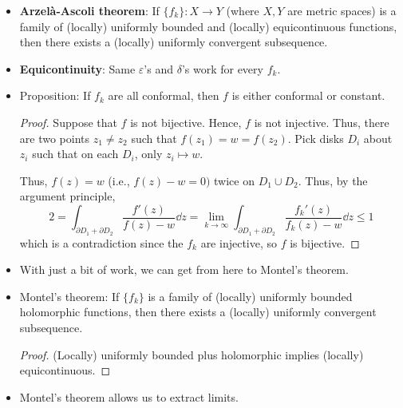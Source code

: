 \documentclass[../notes.tex]{subfiles}
\begin{document}
\begin{itemize}
\begin{enumerate}
        \item Take a limit of this maximizing sequence (this is where the real magic happens, using the argument principle and such).
        \begin{proof}[Proof Sketch]
            Set $\mathcal{F}=\{f:U\to\D\mid\text{conformal, }f(z_0)=0\}$. This family is uniformly bounded (e.g., by the unit disk). Let
            \begin{equation*}
                \alpha := \sup_{f\in\mathcal{F}}|f'(z_0)|
            \end{equation*}
            The set of all $f_k$ such that $|f_k'(z_0)|\to\alpha$ has a uniformly convergent subsequence. If $f_k\to f$ locally uniformly, then by the theorem from last class, $f$ is holomorphic. Additionally, $f$ is also conformal because it is holomorphic and bijective (see the following proposition), hence biholomorphic.
        \end{proof}
    \end{enumerate}
    \item \textbf{Arzel\`{a}-Ascoli theorem}: If $\{f_k\}:X\to Y$ (where $X,Y$ are metric spaces) is a family of (locally) uniformly bounded and (locally) equicontinuous functions, then there exists a (locally) uniformly convergent subsequence.
    \item \textbf{Equicontinuity}: Same $\varepsilon$'s and $\delta$'s work for every $f_k$.
    \item Proposition: If $f_k$ are all conformal, then $f$ is either conformal or constant.
    \begin{proof}
        Suppose that $f$ is not bijective. Hence, $f$ is not injective. Thus, there are two points $z_1\neq z_2$ such that $f(z_1)=w=f(z_2)$. Pick disks $D_i$ about $z_i$ such that on each $D_i$, only $z_i\mapsto w$.\par
        Thus, $f(z)=w$ (i.e., $f(z)-w=0)$ twice on $D_1\cup D_2$. Thus, by the argument principle,
        \begin{equation*}
            2 = \int_{\partial D_1+\partial D_2}\frac{f'(z)}{f(z)-w}\dd{z}
            = \lim_{k\to\infty}\int_{\partial D_1+\partial D_2}\frac{f_k'(z)}{f_k(z)-w}\dd{z}
            \leq 1
        \end{equation*}
        which is a contradiction since the $f_k$ are injective, so $f$ is bijective.
    \end{proof}
    \item With just a bit of work, we can get from here to Montel's theorem.
    \item Montel's theorem: If $\{f_k\}$ is a family of (locally) uniformly bounded holomorphic functions, then there exists a (locally) uniformly convergent subsequence.
    \begin{proof}
        (Locally) uniformly bounded plus holomorphic implies (locally) equicontinuous.
    \end{proof}
    \item Montel's theorem allows us to extract limits.
\end{itemize}
\end{document}
